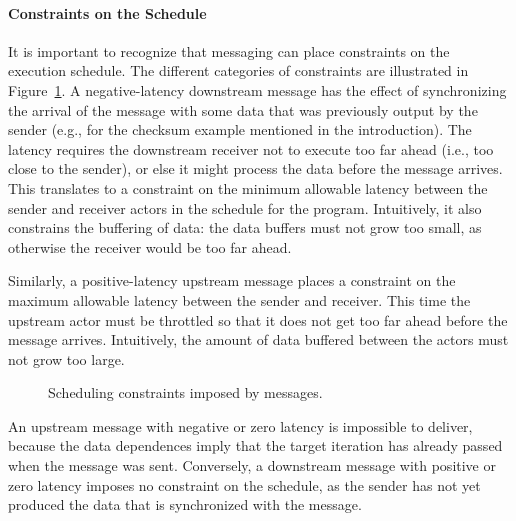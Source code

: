 \documentclass{sig-alternate}
\begin{document}
\paragraph*{Constraints on the Schedule}  
\label{sec:constraints}
It is important to recognize that messaging can place constraints on
the execution schedule.  The different categories of constraints are
illustrated in Figure~\ref{tab:messcons}.  A negative-latency
downstream message has the effect of synchronizing the arrival of the
message with some data that was previously output by the sender (e.g.,
for the checksum example mentioned in the introduction).  The latency
requires the downstream receiver not to execute too far ahead (i.e.,
too close to the sender), or else it might process the data before the
message arrives.  This translates to a constraint on the minimum
allowable latency between the sender and receiver actors in the
schedule for the program.  Intuitively, it also constrains the
buffering of data: the data buffers must not grow too small, as
otherwise the receiver would be too far ahead.

Similarly, a positive-latency upstream message places a constraint on
the maximum allowable latency between the sender and receiver.  This
time the upstream actor must be throttled so that it does not get too
far ahead before the message arrives.  Intuitively, the amount of data
buffered between the actors must not grow too large.

\begin{figure}[t]
\begin{center}
\vspace{-16pt}
\caption{\small Scheduling constraints imposed by messages.}
\label{tab:messcons}
\end{center}
\vspace{-18pt}
\end{figure}

An upstream message with negative or zero latency is impossible to
deliver, because the data dependences imply that the target iteration
has already passed when the message was sent.  Conversely, a
downstream message with positive or zero latency imposes no constraint
on the schedule, as the sender has not yet produced the data that is
synchronized with the message.
\end{document}
